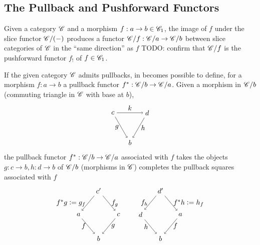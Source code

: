 \documentclass[12pt]{article}
\theoremstyle{definition}
\theoremstyle{remark}
\begin{document}
\subsection{The Pullback and Pushforward Functors}

Given a category $\mathscr{C}$ and a morphism $f : a \to b \in \mathscr{C}_1$, the image of $f$ under the slice functor $\mathscr{C} / (-)$ produces a functor $\mathscr{C} / f : \mathscr{C} / a \to \mathscr{C} / b$ between slice categories of $\mathscr{C}$ in the ``same direction'' as $f$ \textcolor{red!50!black}{TODO: confirm that $\mathscr{C} / f$ is the pushforward functor $f_{!}$ of $f \in \mathscr{C}_1$.}

If the given category $\mathscr{C}$ admits pullbacks, in becomes possible to define, for a morphism $f : a \to b$ a pullback functor $f^{*} : \mathscr{C} / b \to \mathscr{C} / a$. Given a morphism in $\mathscr{C}/b$ (commuting triangle in $\mathscr{C}$ with base at $b$),
\[
    \begin{tikzpicture}
        \begin{scope}[shift={(+3,0)}]
            \draw (150:1) node(ltl){$c$};
            \draw ( 30:1) node(ltr){$d$};
            \draw (270:1) node(lbm){$b$};

            \draw[->] (ltl) to node[below,left ]{$g$}  (lbm);
            \draw[->] (ltr) to node[below,right]{$h$} (lbm);
            \draw[->] (ltl) to node[above]{$k$} (ltr);
        \end{scope}
    \end{tikzpicture}
\]
the pullback functor $f^{\ast} : \mathscr{C} / b \to \mathscr{C} / a$ associated with $f$ takes the objects $g : c \to b, h : d \to b$ of $\mathscr{C}/b$ (morphisms in $\mathscr{C}$) completes the pullback squares associated with $f$
\[
    \begin{tikzpicture}
        \begin{scope}[shift={(0,0)}]
            \draw ( 90:1.2) node(t){$c'$};
            \draw (180:1) node(l){$a$};
            \draw (  0:1) node(r){$c$};
            \draw (270:1.2) node(b){$b$};

            \draw[->] (l) to node[below,left ]{$f$} (b);
            \draw[->] (r) to node[below,right]{$g$} (b);
            \draw[->] (t) to node[above,left ]{$f^{\ast}g \vcentcolon= g_{f}$} (l);
            \draw[->] (t) to node[above,right]{$f_{g}$} (r);
        \end{scope}
    \end{tikzpicture}
    \qquad
    \begin{tikzpicture}
        \begin{scope}[shift={(0,0)}]
            \draw ( 90:1.2) node(t){$d'$};
            \draw (180:1) node(l){$d$};
            \draw (  0:1) node(r){$a$};
            \draw (270:1.2) node(b){$b$};

            \draw[->] (l) to node[below,left ]{$h$} (b);
            \draw[->] (r) to node[below,right]{$f$} (b);
            \draw[->] (t) to node[above,left ]{$f_{h}$} (l);
            \draw[->] (t) to node[above,right]{$f^{\ast}h \vcentcolon= h_{f}$} (r);
        \end{scope}
    \end{tikzpicture}
\]
\end{document}
